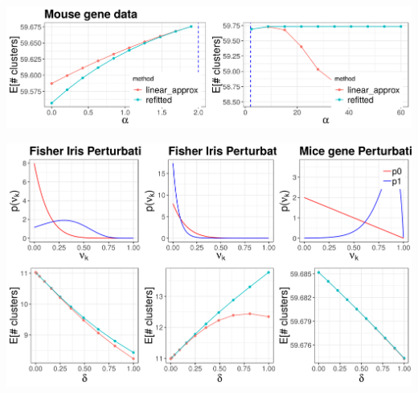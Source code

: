 \documentclass[a0,plainsections,30pt]{sciposter}\usepackage[]{graphicx}\usepackage[]{color}
\newenvironment{knitrout}{}{} %
\begin{document}
\begin{minipage}[t]{0.45\textwidth}
\begin{knitrout}
{}



\end{knitrout}

\begin{knitrout}
\color{fgcolor}

{\centering \includegraphics[width=0.98\linewidth,height=0.294\linewidth]{figure/gene_param_sens_plot-1} 

}



\end{knitrout}

\vspace{0.1in}

\begin{knitrout}
\color{fgcolor}

{\centering \includegraphics[width=0.98\linewidth,height=0.588\linewidth]{figure/functional_sens_plot-1} 

}



\end{knitrout}


\end{minipage}
\end{document}
